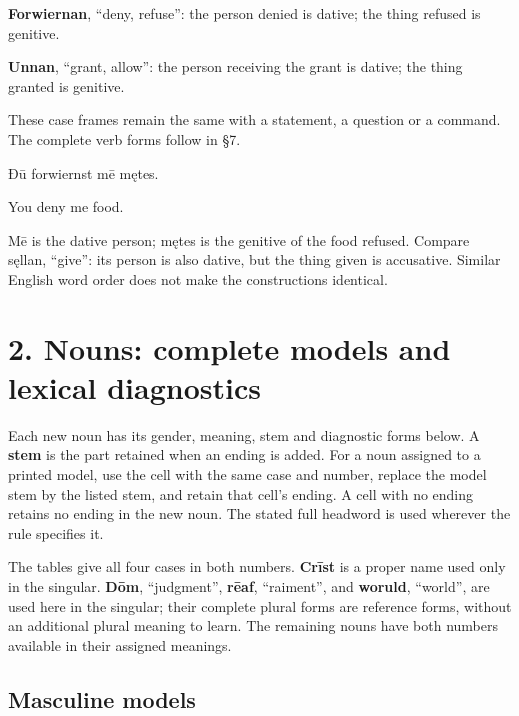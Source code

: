 \textbf{Forwiernan}, “deny, refuse”: the person denied is dative; the thing refused is genitive.

\textbf{Unnan}, “grant, allow”: the person receiving the grant is dative; the thing granted is genitive.

These case frames remain the same with a statement, a question or a command. The complete verb forms follow in §7.

Ðū forwiernst mē mętes.

You deny me food.

Mē is the dative person; mętes is the genitive of the food refused. Compare sęllan, “give”: its person is also dative, but the thing given is accusative. Similar English word order does not make the constructions identical.

\section*{2. Nouns: complete models and lexical diagnostics}

Each new noun has its gender, meaning, stem and diagnostic forms below. A \textbf{stem} is the part retained when an ending is added. For a noun assigned to a printed model, use the cell with the same case and number, replace the model stem by the listed stem, and retain that cell's ending. A cell with no ending retains no ending in the new noun. The stated full headword is used wherever the rule specifies it.

The tables give all four cases in both numbers. \textbf{Crīst} is a proper name used only in the singular. \textbf{Dōm}, “judgment”, \textbf{rēaf}, “raiment”, and \textbf{woruld}, “world”, are used here in the singular; their complete plural forms are reference forms, without an additional plural meaning to learn. The remaining nouns have both numbers available in their assigned meanings.

\subsection*{Masculine models}

